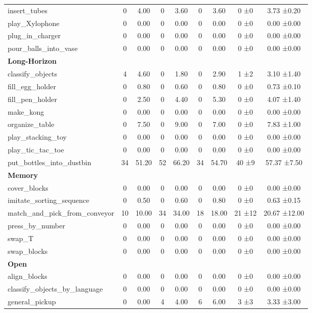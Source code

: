 \begin{table}[H]
{\begin{tabular}{l|c|c|c|c|c|c|c|c}
insert\_tubes & 0 & 4.00 & 0 & 3.60 & 0 & 3.60 & 0 ±0 & 3.73 ±0.20 \\
play\_Xylophone & 0 & 0.00 & 0 & 0.00 & 0 & 0.00 & 0 ±0 & 0.00 ±0.00 \\
plug\_in\_charger & 0 & 0.00 & 0 & 0.00 & 0 & 0.00 & 0 ±0 & 0.00 ±0.00 \\
pour\_balls\_into\_vase & 0 & 0.00 & 0 & 0.00 & 0 & 0.00 & 0 ±0 & 0.00 ±0.00 \\
\hline
\multicolumn{9}{l}{\textbf{Long-Horizon}} \\
classify\_objects & 4 & 4.60 & 0 & 1.80 & 0 & 2.90 & 1 ±2 & 3.10 ±1.40 \\
fill\_egg\_holder & 0 & 0.80 & 0 & 0.60 & 0 & 0.80 & 0 ±0 & 0.73 ±0.10 \\
fill\_pen\_holder & 0 & 2.50 & 0 & 4.40 & 0 & 5.30 & 0 ±0 & 4.07 ±1.40 \\
make\_kong & 0 & 0.00 & 0 & 0.00 & 0 & 0.00 & 0 ±0 & 0.00 ±0.00 \\
organize\_table & 0 & 7.50 & 0 & 9.00 & 0 & 7.00 & 0 ±0 & 7.83 ±1.00 \\
play\_stacking\_toy & 0 & 0.00 & 0 & 0.00 & 0 & 0.00 & 0 ±0 & 0.00 ±0.00 \\
play\_tic\_tac\_toe & 0 & 0.00 & 0 & 0.00 & 0 & 0.00 & 0 ±0 & 0.00 ±0.00 \\
put\_bottles\_into\_dustbin & 34 & 51.20 & 52 & 66.20 & 34 & 54.70 & 40 ±9 & 57.37 ±7.50 \\
\hline
\multicolumn{9}{l}{\textbf{Memory}} \\
cover\_blocks & 0 & 0.00 & 0 & 0.00 & 0 & 0.00 & 0 ±0 & 0.00 ±0.00 \\
imitate\_sorting\_sequence & 0 & 0.50 & 0 & 0.60 & 0 & 0.80 & 0 ±0 & 0.63 ±0.15 \\
match\_and\_pick\_from\_conveyor & 10 & 10.00 & 34 & 34.00 & 18 & 18.00 & 21 ±12 & 20.67 ±12.00 \\
press\_by\_number & 0 & 0.00 & 0 & 0.00 & 0 & 0.00 & 0 ±0 & 0.00 ±0.00 \\
swap\_T & 0 & 0.00 & 0 & 0.00 & 0 & 0.00 & 0 ±0 & 0.00 ±0.00 \\
swap\_blocks & 0 & 0.00 & 0 & 0.00 & 0 & 0.00 & 0 ±0 & 0.00 ±0.00 \\
\hline
\multicolumn{9}{l}{\textbf{Open}} \\
align\_blocks & 0 & 0.00 & 0 & 0.00 & 0 & 0.00 & 0 ±0 & 0.00 ±0.00 \\
classify\_objects\_by\_language & 0 & 0.00 & 0 & 0.00 & 0 & 0.00 & 0 ±0 & 0.00 ±0.00 \\
general\_pickup & 0 & 0.00 & 4 & 4.00 & 6 & 6.00 & 3 ±3 & 3.33 ±3.00 \\

\end{tabular}}
\end{table}
